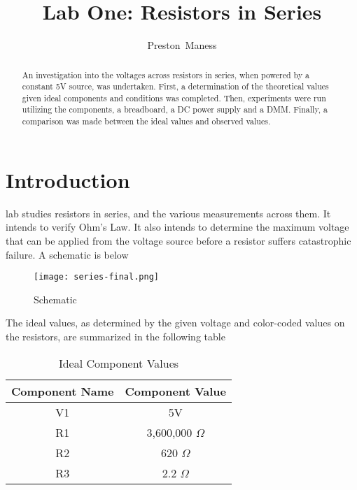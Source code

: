 \documentclass[journal]{IEEEtran}
\begin{document}
\title{Lab One: Resistors in Series}
\author{Preston~Maness}

%
{}

\maketitle

\begin{abstract}
An investigation into the voltages across resistors in series, when powered by a constant 
5V source, was undertaken. First, a determination of the theoretical values given ideal 
components and conditions was completed. Then, experiments were run utilizing the components, 
a breadboard, a DC power supply and a DMM. Finally, a comparison was made between the ideal 
values and observed values.
\end{abstract}

\section{Introduction}
 lab studies resistors in series, and the various measurements 
across them. It intends to verify Ohm's Law. It also intends to determine the maximum 
voltage that can be applied from the voltage source before a resistor suffers catastrophic 
failure. A schematic is below

\begin{figure}[h!]
\centering
\texttt{[image: series-final.png]}
\caption{Schematic}
\label{fig_schem}
\end{figure}

The ideal values, as determined by the given voltage and color-coded values 
on the resistors, are summarized in the following table

\begin{table}[h!]
\renewcommand{\arraystretch}{1.5}
\caption{Ideal Component Values}
\label{table_ideal}
\centering
\begin{tabular}{|c|c|}
\hline
Component Name & Component Value\\
\hline
V1 & 5V\\
\hline
R1 & 3,600,000 $\Omega$\\
\hline
R2 & 620 $\Omega$\\
\hline
R3 & 2.2 $\Omega$\\
\hline
\end{tabular}
\end{table}
\end{document}
